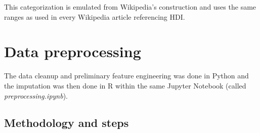 \documentclass[]{article}
\begin{document}
This categorization is emulated from Wikipedia's construction and uses
the same ranges as used in every Wikipedia article referencing HDI.

\hypertarget{data-preprocessing}{%
\section{Data preprocessing}\label{data-preprocessing}}

The data cleanup and preliminary feature engineering was done in Python
and the imputation was then done in R within the same Jupyter Notebook
(called \emph{preprocessing.ipynb}).

\hypertarget{methodology-and-steps}{%
\subsection{Methodology and steps}\label{methodology-and-steps}}
\end{document}
